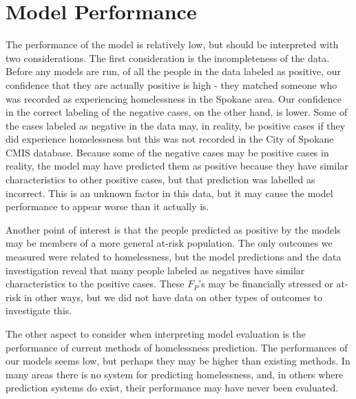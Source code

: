 \documentclass[12pt]{report}
\begin{document}
\section{Model Performance}
The performance of the model is relatively low, but should be interpreted with two considerations. The first consideration is the incompleteness of the data. Before any models are run, of all the people in the data labeled as positive, our confidence that they are actually positive is high - they matched someone who was recorded as experiencing homelessness in the Spokane area. Our confidence in the correct labeling of the negative cases, on the other hand, is lower. Some of the cases labeled as negative in the data may, in reality, be positive cases if they did experience homelessness but this was not recorded in the City of Spokane CMIS database. Because some of the negative cases may be positive cases in reality, the model may have predicted them as positive because they have similar characteristics to other positive cases, but that prediction was labelled as incorrect. This is an unknown factor in this data, but it may cause the model performance to appear worse than it actually is.

Another point of interest is that the people predicted as positive by the models may be members of a more general at-risk population. The only outcomes we measured were related to homelessness, but the model predictions and the data investigation reveal that many people labeled as negatives have similar characteristics to the positive cases. These $F_P$'s may be financially stressed or at-risk in other ways, but we did not have data on other types of outcomes to investigate this.

The other aspect to consider when interpreting model evaluation is the performance of current methods of homelessness prediction. The performances of our models seems low, but perhaps they may be higher than existing methods. In many areas there is no system for predicting homelessness, and, in others where prediction systems do exist, their performance may have never been evaluated.
\end{document}
